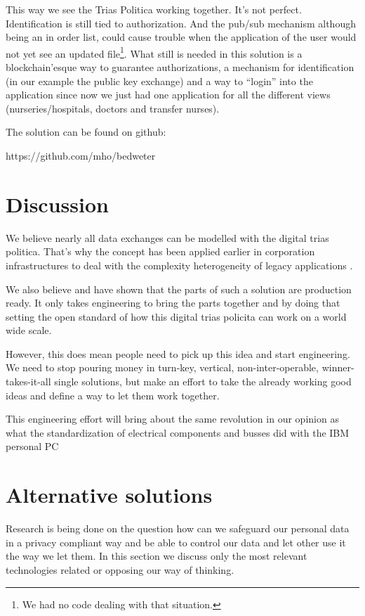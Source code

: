 \documentclass{article}
\begin{document}
This way we see the Trias Politica working together. It's not perfect. Identification is still tied to authorization. And the pub/sub mechanism although being an in order list, could cause trouble when the application of the user would not yet see an updated file\footnote{We had no code dealing with that situation.}. What still is needed in this solution is a blockchain'esque way to guarantee authorizations, a mechanism for identification (in our example the public key exchange) and a way to ``login'' into the application since now we just had one application for all the different views (nurseries/hospitals, doctors and transfer nurses).

The solution can be found on github: \SetWatermarkText{}

https://github.com/mho/bedweter

\section{Discussion}
We believe nearly all data exchanges can be modelled with the digital trias politica. That's why the concept has been applied earlier in corporation infrastructures to deal with the complexity heterogeneity of legacy applications \cite{harnik2011secure}. 

We also believe and have shown that the parts of such a solution are production ready. It only takes engineering to bring the parts together and by doing that setting the open standard of how this digital trias policita can work on a world wide scale. 

However, this does mean people need to pick up this idea and start engineering. We need to stop pouring money in turn-key, vertical, non-inter-operable, winner-takes-it-all single solutions, but make an effort to take the already working good ideas and define a way to let them work together. 

This engineering effort will bring about the same revolution in our opinion as what the standardization of electrical components and busses did with the IBM personal PC
\appendix
\section{Alternative solutions}
%
Research is being done on the question how can we safeguard our personal data in a privacy compliant way and be able to control our data and let other use it the way we let them. In this section we discuss only the most relevant technologies related or opposing our way of thinking.
\end{document}
